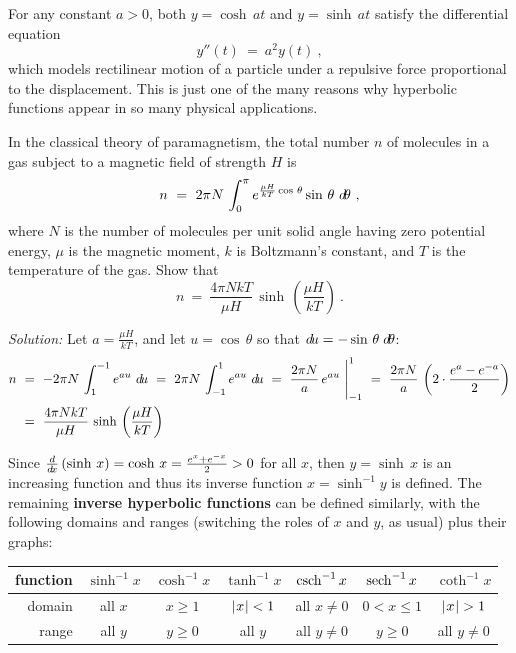\noindent For any constant $a>0$, both $y=\cosh\,at$ and $y=\sinh\,at$ satisfy
the differential equation
\[
y''(t) ~=~ a^2y(t) ~,
\]
which models rectilinear motion of a particle under a repulsive force
proportional to the displacement. This is just one of the many reasons why
hyperbolic functions appear in so many physical applications.
\newpage
\begin{exmp}\label{exmp:paramag}
\noindent In the classical theory of paramagnetism, the total number $n$ of
molecules in a gas subject to a magnetic field of strength $H$ is
\[
n ~=~ 2\pi N\,\int_0^{\pi} e^{\frac{\mu H}{kT}\cos\,\theta}\sin\,\theta~d\!\theta ~,
\]
where $N$ is the number of molecules per unit solid angle having zero potential
energy, $\mu$ is the magnetic moment, $k$ is Boltzmann's constant, and $T$ is
the temperature of the gas. Show that
\[
n ~=~ \frac{4\pi NkT}{\mu H}\,\sinh\,\left(\frac{\mu H}{kT}\right) ~.
\]
\par\noindent\emph{Solution:} Let $a=\frac{\mu H}{kT}$, and let $u=\cos\,\theta$
so that $d\!u=-\sin\,\theta\;d\!\theta$:
\begin{align*}
n ~&=~ -2\pi N\,\int_1^{-1} e^{au}~d\!u ~=~ 2\pi N\,\int_{-1}^{1} e^{au}~d\!u
   ~=~ \frac{2\pi N}{a}\,e^{au}~\Biggr|_{-1}^1 ~=~
    \frac{2\pi N}{a}\,\left(2 \cdot \frac{e^a - e^{-a}}{2}\right)\\
&=~ \frac{4\pi NkT}{\mu H}\,\sinh\,\left(\frac{\mu H}{kT}\right)
\end{align*}
\end{exmp}
\divider
\vspace{2mm}

Since $\frac{d}{d\!x}\,(\sinh\,x) = \cosh\,x = \frac{e^x+e^{-x}}{2} > 0$ for all $x$, then
$y=\sinh\,x$ is an increasing function and thus its inverse function
$x=\sinh^{-1}y$ is defined. The remaining \textbf{inverse hyperbolic functions}
can be defined similarly, with the following domains and ranges (switching the
roles of $x$ and $y$, as usual) plus their graphs:

\begin{center}
\bgroup
\def\arraystretch{1.5}
\begin{tabular}{@{}|r||c|c|c|c|c|c|@{}}
\hline
function & $\sinh^{-1} x$ & $\cosh^{-1} x$ & $\tanh^{-1} x$ &
$\operatorname{csch}^{-1} x$ & $\operatorname{sech}^{-1} x$ & $\coth^{-1} x$\\
\hline
domain & all $x$ & $x \ge 1$ & $\lvert\mspace{1mu}x\mspace{1mu}\rvert < 1$ & all $x \ne 0$ & $0 < x \le 1$ & $\lvert\mspace{1mu}x\mspace{1mu}\rvert > 1$\\
\hline
range & all $y$ & $y \ge 0$ & all $y$ & all $y \ne 0$ & $y \ge 0$ & all $y \ne 0$\\
\hline
\end{tabular}
\egroup
\end{center}

